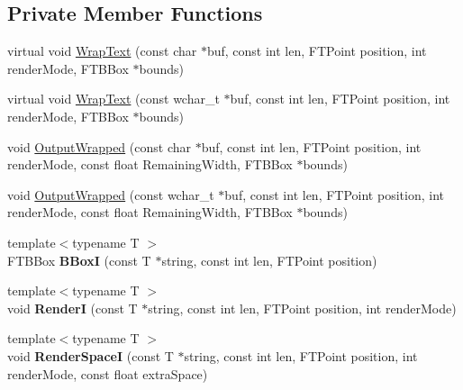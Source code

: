 \subsection*{Private Member Functions}
\begin{DoxyCompactItemize}
\item 
virtual void \hyperlink{class_f_t_simple_layout_impl_aefdfcffcfca03e0139db7e21c968f7c5}{Wrap\+Text} (const char $\ast$buf, const int len, F\+T\+Point position, int render\+Mode, F\+T\+B\+Box $\ast$bounds)
\item 
virtual void \hyperlink{class_f_t_simple_layout_impl_a344c5b35b3b02da0deea00b337017389}{Wrap\+Text} (const wchar\+\_\+t $\ast$buf, const int len, F\+T\+Point position, int render\+Mode, F\+T\+B\+Box $\ast$bounds)
\item 
void \hyperlink{class_f_t_simple_layout_impl_ab08c29c22c870026c0de687398302c08}{Output\+Wrapped} (const char $\ast$buf, const int len, F\+T\+Point position, int render\+Mode, const float Remaining\+Width, F\+T\+B\+Box $\ast$bounds)
\item 
void \hyperlink{class_f_t_simple_layout_impl_a8a0e01a58af988be392daad3187f1139}{Output\+Wrapped} (const wchar\+\_\+t $\ast$buf, const int len, F\+T\+Point position, int render\+Mode, const float Remaining\+Width, F\+T\+B\+Box $\ast$bounds)
\item 
{\footnotesize template$<$typename T $>$ }\\F\+T\+B\+Box {\bfseries B\+BoxI} (const T $\ast$string, const int len, F\+T\+Point position)\hypertarget{class_f_t_simple_layout_impl_a104961c1909af9520dc1b320ef9b7dd1}{}\label{class_f_t_simple_layout_impl_a104961c1909af9520dc1b320ef9b7dd1}

\item 
{\footnotesize template$<$typename T $>$ }\\void {\bfseries RenderI} (const T $\ast$string, const int len, F\+T\+Point position, int render\+Mode)\hypertarget{class_f_t_simple_layout_impl_a37fb21ef3b7979d5179acaa483f0e00e}{}\label{class_f_t_simple_layout_impl_a37fb21ef3b7979d5179acaa483f0e00e}

\item 
{\footnotesize template$<$typename T $>$ }\\void {\bfseries Render\+SpaceI} (const T $\ast$string, const int len, F\+T\+Point position, int render\+Mode, const float extra\+Space)\hypertarget{class_f_t_simple_layout_impl_a0264621b2b6a40ffea0bc56828bd4c33}{}\label{class_f_t_simple_layout_impl_a0264621b2b6a40ffea0bc56828bd4c33}


\end{DoxyCompactItemize}
